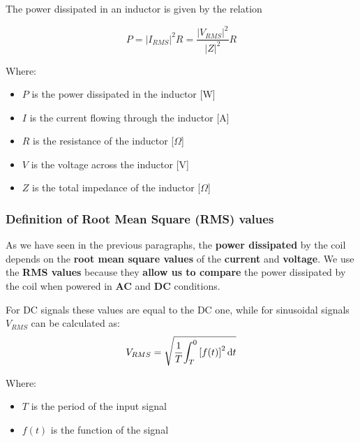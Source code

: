 \begin{samepage}
    The power dissipated in an inductor is given by the relation
    \nopagebreak

    \begin{equation}
        P = |I_{RMS}|^2R = \frac{|V_{RMS}|^2}{|Z|^2}R
        \label{eq: Joule_heating}
    \end{equation}
    \nopagebreak

    Where:
    \begin{itemize}
        \item \( P \) is the power dissipated in the inductor [W]
        \item \( I \) is the current flowing through the inductor [A]
        \item \( R \) is the resistance of the inductor [\(\Omega\)]
        \item \( V \) is the voltage across the inductor [V]
        \item \( Z \) is the total impedance of the inductor [\(\Omega\)]
    \end{itemize}
\end{samepage}

\subsubsection{Definition of Root Mean Square (RMS) values}
As we have seen in the previous paragraphs, the \textbf{power dissipated} by the coil depends on the \textbf{root mean square values} of the \textbf{current} and \textbf{voltage}.
We use the \textbf{RMS values} because they \textbf{allow us to compare} the power dissipated by the coil when powered in \textbf{AC} and \textbf{DC} conditions.

\begin{samepage}
    For DC signals these values are equal to the DC one, while for sinusoidal signals $V_{RMS}$ can be calculated as:
    \begin{equation*}
        V_{RMS} = \sqrt{\frac{1}{T} {\int_{T}^{0} {[f(t)]}^2\, {\rm d}t}}
    \end{equation*}
    \nopagebreak

    Where:
    \begin{itemize}
        \item \(T\) is the period of the input signal
        \item \(f(t)\) is the function of the signal 
    \end{itemize}
    \hfill
\end{samepage}

